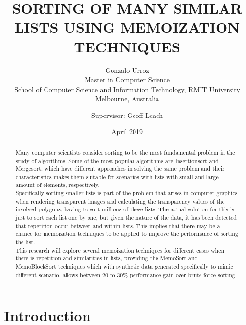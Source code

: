 \documentclass[a4paper,12pt]{article}
\begin{document}
\title{\uppercase{Sorting of many similar lists using memoization techniques}} 
\author{Gonzalo Urroz\\
{\small Master in Computer Science }\\
{\small School of Computer Science and Information Technology, RMIT University } \\
{\small Melbourne, Australia }\\
\and Supervisor: Geoff Leach
}

\date{April 2019}
\maketitle

\begin{abstract}
Many computer scientists consider sorting to be the most fundamental problem in the study of algorithms. Some of the most popular algorithms are Insertionsort and Mergesort, which have different approaches in solving the same problem and their characteristics makes them suitable for scenarios with lists with small and large amount of elements, respectively. \\
Specifically sorting smaller lists is part of the problem that arises in computer graphics when rendering transparent images and calculating the transparency values of the involved polygons, having to sort millions of these lists. The actual solution for this is just to sort each list one by one, but given the nature of the data, it has been detected that repetition occur between and within lists. This implies that there may be a chance for memoization techniques to be applied to improve the performance of sorting the list. \\
This research will explore several memoization techniques for different cases when there is repetition and similarities in lists, providing the MemoSort and MemoBlockSort techniques which with synthetic data  generated specifically to mimic different scenario, allows between 20 to 30\% performance gain over brute force sorting.

\end{abstract}

\newpage
\tableofcontents
\newpage

\section{Introduction}
\end{document}
